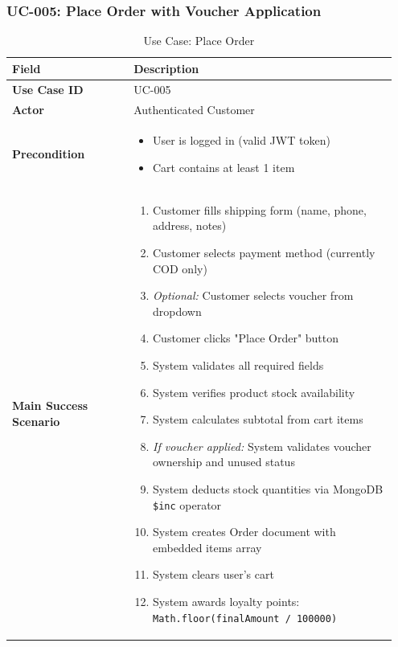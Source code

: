 \documentclass[12pt, a4paper]{report}
\begin{document}
\subsubsection{UC-005: Place Order with Voucher Application}

\begin{table}[H]
\centering
\caption{Use Case: Place Order}
\label{tab:uc_order}
\begin{tabular}{@{}p{0.30\linewidth}p{0.65\linewidth}@{}}
\toprule
\textbf{Field} & \textbf{Description} \\
\midrule
\textbf{Use Case ID} & UC-005 \\
\textbf{Actor} & Authenticated Customer \\
\textbf{Precondition} & 
\begin{minipage}[t]{\linewidth}
\begin{itemize}[leftmargin=*, nosep]
    \item User is logged in (valid JWT token)
    \item Cart contains at least 1 item
\end{itemize}
\end{minipage} \\
\textbf{Main Success Scenario} & 
\begin{minipage}[t]{\linewidth}
\begin{enumerate}[leftmargin=*, nosep]
    \item Customer fills shipping form (name, phone, address, notes)
    \item Customer selects payment method (currently COD only)
    \item \textit{Optional:} Customer selects voucher from dropdown
    \item Customer clicks "Place Order" button
    \item System validates all required fields
    \item System verifies product stock availability
    \item System calculates subtotal from cart items
    \item \textit{If voucher applied:} System validates voucher ownership and unused status
    \item System deducts stock quantities via MongoDB \texttt{\$inc} operator
    \item System creates Order document with embedded items array
    \item System clears user's cart
    \item System awards loyalty points: \texttt{Math.floor(finalAmount / 100000)}

\end{enumerate}
\end{minipage}
\end{tabular}
\end{table}
\end{document}
